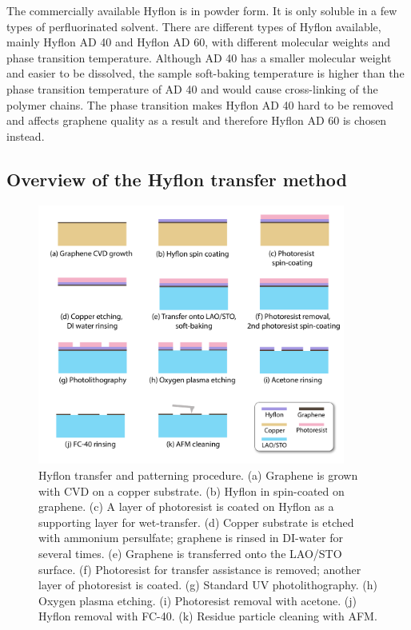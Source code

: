 \documentclass[pdflatex, sectionletters, 12pt]{pittetd}    %
\begin{document}
The commercially available Hyflon is in powder form. It is only soluble in a few types of perfluorinated solvent. There are different types of Hyflon available, mainly Hyflon AD 40 and Hyflon AD 60, with different molecular weights and phase transition temperature. Although AD 40 has a smaller molecular weight and easier to be dissolved, the sample soft-baking temperature is higher than the phase transition temperature of AD 40 and would cause cross-linking of the polymer chains. The phase transition makes Hyflon AD 40 hard to be removed and affects graphene quality as a result and therefore Hyflon AD 60 is chosen instead.

\subsection{Overview of the Hyflon transfer method}

\begin{figure}[p]
	\centering
	\includegraphics[width=0.9\textwidth]{Drawing/HyflonTransfer.pdf}
	\caption{Hyflon transfer and patterning procedure. (a) Graphene is grown with CVD on a copper substrate. (b) Hyflon in spin-coated on graphene. (c) A layer of photoresist is coated on Hyflon as a supporting layer for wet-transfer. (d) Copper substrate is etched with ammonium persulfate; graphene is rinsed in DI-water for several times. (e) Graphene is transferred onto the LAO/STO surface. (f) Photoresist for transfer assistance is removed; another layer of photoresist is coated. (g) Standard UV photolithography. (h) Oxygen plasma etching. (i) Photoresist removal with acetone. (j) Hyflon removal with FC-40. (k) Residue particle cleaning with AFM.}
	\label{FIG:HyflonTransfer}
\end{figure}
\end{document}
